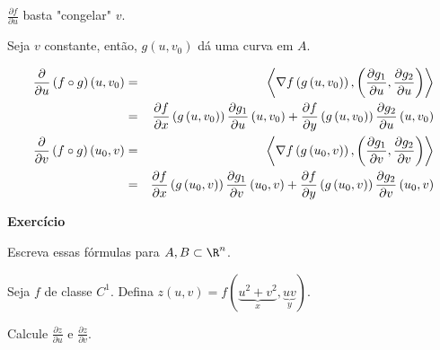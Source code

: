 \documentclass{book}
\begin{document}
\begin{dem}


$\frac{{\partial f}}{{\partial u}}$ basta "congelar" $v$.

Seja $v$ constante, ent\~ao, $g\left( {u,v_0 } \right)$ d\'a uma curva em $A$.

\begin{eqnarray*}
\frac{\partial }
{{\partial u}}\left( {f \circ g} \right)\left( {u,v_0 } \right) &=& \left\langle {\nabla f\left( {g\left( {u,v_0 } \right)} \right),\left( {\frac{{\partial g_1 }}
{{\partial u}},\frac{{\partial g_2 }}
{{\partial u}}} \right)} \right\rangle  \hfill \\
&=& \frac{{\partial f}}
{{\partial x}}\left( {g\left( {u,v_0 } \right)} \right)\frac{{\partial g_1 }}
{{\partial u}}\left( {u,v_0 } \right) + \frac{{\partial f}}
{{\partial y}}\left( {g\left( {u,v_0 } \right)} \right)\frac{{\partial g_2 }}
{{\partial u}}\left( {u,v_0 } \right) \hfill \\
\frac{\partial }
{{\partial v}}\left( {f \circ g} \right)\left( {u_0 ,v} \right) &=& \left\langle {\nabla f\left( {g\left( {u_0 ,v} \right)} \right),\left( {\frac{{\partial g_1 }}
{{\partial v}},\frac{{\partial g_2 }}
{{\partial v}}} \right)} \right\rangle  \hfill \\
&=& \frac{{\partial f}}
{{\partial x}}\left( {g\left( {u_0 ,v} \right)} \right)\frac{{\partial g_1 }}
{{\partial v}}\left( {u_0 ,v} \right) + \frac{{\partial f}}
{{\partial y}}\left( {g\left( {u_0 ,v} \right)} \right)\frac{{\partial g_2 }}
{{\partial v}}\left( {u_0 ,v} \right) \hfill \\
\end{eqnarray*}

\end{dem}

\textbf{Exerc\'icio}

\begin{exerc}
Escreva essas f\'ormulas para $A,B \subset \R^n$.
\end{exerc}

\begin{ex}
Seja $f$ de classe $C^1$. Defina $z\left( {u,v} \right) = f\left( {\underbrace {u^2  + v^2 }_x,\underbrace {uv}_y} \right)$.

Calcule $\frac{{\partial z}}{{\partial u}}$ e $\frac{{\partial z}}{{\partial v}}$.
\end{ex}
\end{document}
